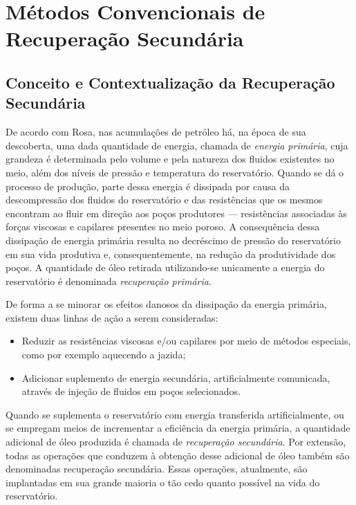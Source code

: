 
\section{Métodos Convencionais de Recuperação Secundária}

\subsection{Conceito e Contextualização da Recuperação Secundária}

De acordo com Rosa, nas acumulações de petróleo há, na época de sua descoberta, uma dada quantidade de energia, chamada de \textit{energia primária}, cuja grandeza é determinada pelo volume e pela natureza dos fluidos existentes no meio, além dos níveis de pressão e temperatura do reservatório. Quando se dá o processo de produção, parte dessa energia é dissipada por causa da descompressão dos fluidos do reservatório e das resistências que os mesmos encontram ao fluir em direção aos poços produtores --- resistências associadas às forças viscosas e capilares presentes no meio poroso. A consequência dessa dissipação de energia primária resulta no decréscimo de pressão do reservatório em sua vida produtiva e, consequentemente, na redução da produtividade dos poços. A quantidade de óleo retirada utilizando-se unicamente a energia do reservatório é denominada \textit{recuperação primária}.

De forma a se minorar os efeitos danosos da dissipação da energia primária, existem duas linhas de ação a serem consideradas:

\begin{itemize}
\item Reduzir as resistências viscosas e/ou capilares por meio de métodos especiais, como por exemplo aquecendo a jazida;
\item Adicionar suplemento de energia secundária, artificialmente comunicada, através de injeção de fluidos em poços selecionados.
\end{itemize}

Quando se suplementa o reservatório com energia transferida artificialmente, ou se empregam meios de incrementar a eficiência da energia primária, a quantidade adicional de óleo produzida é chamada de \textit{recuperação secundária}. Por extensão, todas as operações que conduzem à obtenção desse adicional de óleo também são denominadas recuperação secundária. Essas operações, atualmente, são implantadas em sua grande maioria o tão cedo quanto possível na vida do reservatório.

